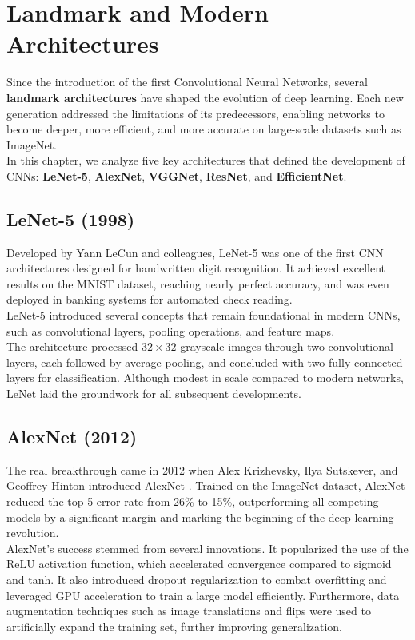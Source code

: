 \chapter{Landmark and Modern Architectures}

Since the introduction of the first Convolutional Neural Networks, several \textbf{landmark architectures} have shaped the evolution of deep learning. Each new generation addressed the limitations of its predecessors, enabling networks to become deeper, more efficient, and more accurate on large-scale datasets such as ImageNet.
\\
In this chapter, we analyze five key architectures that defined the development of CNNs: \textbf{LeNet-5}, \textbf{AlexNet}, \textbf{VGGNet}, \textbf{ResNet}, and \textbf{EfficientNet}.

\section{LeNet-5 (1998)}

Developed by Yann LeCun and colleagues, LeNet-5 \cite{lecun1998gradient} was one of the first CNN architectures designed for handwritten digit recognition. It achieved excellent results on the MNIST dataset, reaching nearly perfect accuracy, and was even deployed in banking systems for automated check reading.
\\
LeNet-5 introduced several concepts that remain foundational in modern CNNs, such as convolutional layers, pooling operations, and feature maps.
\\
The architecture processed $32 \times 32$ grayscale images through two convolutional layers, each followed by average pooling, and concluded with two fully connected layers for classification. Although modest in scale compared to modern networks, LeNet laid the groundwork for all subsequent developments.

\section{AlexNet (2012)}

The real breakthrough came in 2012 when Alex Krizhevsky, Ilya Sutskever, and Geoffrey Hinton introduced AlexNet \cite{krizhevsky2012imagenet}. Trained on the ImageNet dataset, AlexNet reduced the top-5 error rate from 26\% to 15\%, outperforming all competing models by a significant margin and marking the beginning of the deep learning revolution.
\\
AlexNet’s success stemmed from several innovations. It popularized the use of the ReLU activation function, which accelerated convergence compared to sigmoid and tanh. It also introduced dropout regularization to combat overfitting and leveraged GPU acceleration to train a large model efficiently. Furthermore, data augmentation techniques such as image translations and flips were used to artificially expand the training set, further improving generalization.

